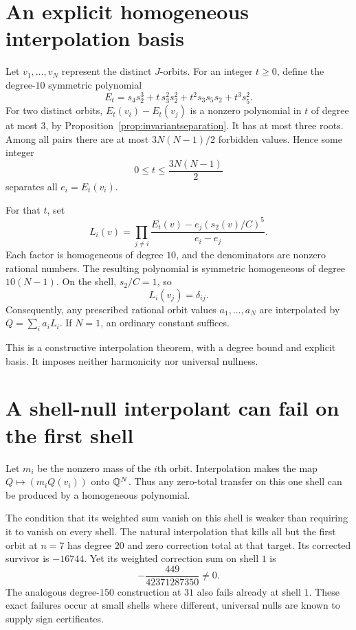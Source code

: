 \section{An explicit homogeneous interpolation basis}
Let $v_1,\ldots,v_N$ represent the distinct $J$-orbits. For an integer $t\ge0$, define the degree-$10$ symmetric polynomial
\begin{equation}\label{eq:et}
E_t=s_4s_2^3+t\,s_3^2s_2^2+t^2s_3s_5s_2+t^3s_5^2.
\end{equation}
For two distinct orbits, $E_t(v_i)-E_t(v_j)$ is a nonzero polynomial in $t$ of degree at most $3$, by Proposition~\ref{prop:invariantseparation}. It has at most three roots. Among all pairs there are at most $3N(N-1)/2$ forbidden values. Hence some integer
\[
0\le t\le\frac{3N(N-1)}2
\]
separates all $e_i=E_t(v_i)$.

For that $t$, set
\begin{equation}\label{eq:li}
L_i(v)=\prod_{j\ne i}
\frac{E_t(v)-e_j(s_2(v)/C)^5}{e_i-e_j}.
\end{equation}
Each factor is homogeneous of degree $10$, and the denominators are nonzero rational numbers. The resulting polynomial is symmetric homogeneous of degree $10(N-1)$. On the shell, $s_2/C=1$, so
\[
L_i(v_j)=\delta_{ij}.
\]
Consequently, any prescribed rational orbit values $a_1,\ldots,a_N$ are interpolated by $Q=\sum_ia_iL_i$. If $N=1$, an ordinary constant suffices.

This is a constructive interpolation theorem, with a degree bound and explicit basis. It imposes neither harmonicity nor universal nullness.

\section{A shell-null interpolant can fail on the first shell}
Let $m_i$ be the nonzero mass of the $i$th orbit. Interpolation makes the map $Q\mapsto(m_iQ(v_i))$ onto $\mathbb Q^N$. Thus any zero-total transfer on this one shell can be produced by a homogeneous polynomial.

The condition that its weighted sum vanish on this shell is weaker than requiring it to vanish on every shell. The natural interpolation that kills all but the first orbit at $n=7$ has degree $20$ and zero correction total at that target. Its corrected survivor is $-16744$. Yet its weighted correction sum on shell $1$ is
\[
-\frac{449}{42371287350}\ne0.
\]
The analogous degree-$150$ construction at $31$ also fails already at shell $1$. These exact failures occur at small shells where different, universal nulls are known to supply sign certificates.

